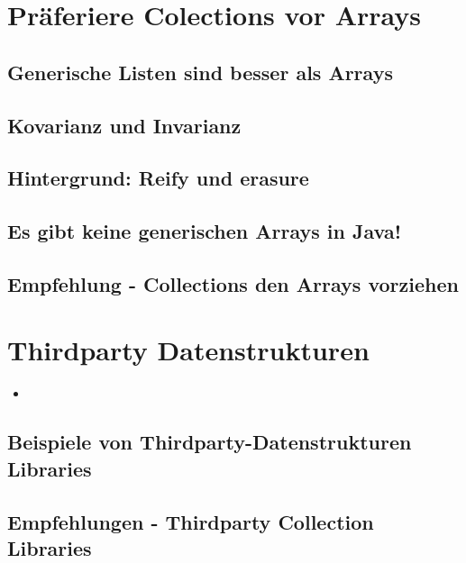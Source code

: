 \section{Präferiere Colections vor Arrays}
\subsection{Generische Listen sind besser als Arrays}
\subsection{Kovarianz und Invarianz}
\subsection{Hintergrund: Reify und erasure}
\subsection{Es gibt keine generischen Arrays in Java!}
\subsection{Empfehlung - Collections den Arrays vorziehen}

\section{Thirdparty Datenstrukturen}
\begin{itemize}[noitemsep,topsep=0pt,leftmargin=*]
    \item
\end{itemize}
\subsection{Beispiele von Thirdparty-Datenstrukturen Libraries}
\subsection{Empfehlungen - Thirdparty Collection Libraries}